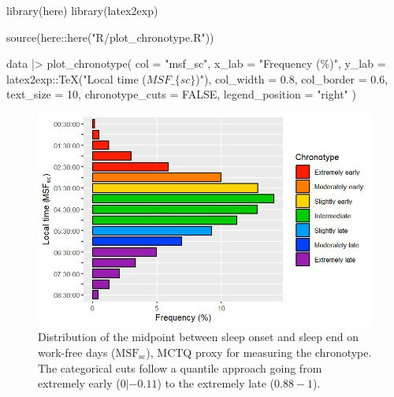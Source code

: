 \documentclass[
  12pt,
  a4paper,
  oneside]{tesesusp}
\newenvironment{Shaded}{\begin{snugshade}}{\end{snugshade}}
\newcommand{\AttributeTok}[1]{\textcolor[rgb]{0.40,0.45,0.13}{#1}}
\newcommand{\ConstantTok}[1]{\textcolor[rgb]{0.56,0.35,0.01}{#1}}
\newcommand{\DecValTok}[1]{\textcolor[rgb]{0.68,0.00,0.00}{#1}}
\newcommand{\FloatTok}[1]{\textcolor[rgb]{0.68,0.00,0.00}{#1}}
\newcommand{\FunctionTok}[1]{\textcolor[rgb]{0.28,0.35,0.67}{#1}}
\newcommand{\NormalTok}[1]{\textcolor[rgb]{0.00,0.23,0.31}{#1}}
\newcommand{\SpecialCharTok}[1]{\textcolor[rgb]{0.37,0.37,0.37}{#1}}
\newcommand{\StringTok}[1]{\textcolor[rgb]{0.13,0.47,0.30}{#1}}
\begin{document}
\begin{Shaded}
\begin{Highlighting}[numbers=left,,]
\FunctionTok{library}\NormalTok{(here)}
\FunctionTok{library}\NormalTok{(latex2exp)}

\FunctionTok{source}\NormalTok{(here}\SpecialCharTok{::}\FunctionTok{here}\NormalTok{(}\StringTok{"R/plot\_chronotype.R"}\NormalTok{))}

\NormalTok{data }\SpecialCharTok{|\textgreater{}} 
    \FunctionTok{plot\_chronotype}\NormalTok{(}
    \AttributeTok{col =} \StringTok{"msf\_sc"}\NormalTok{, }
    \AttributeTok{x\_lab =} \StringTok{"Frequency (\%)"}\NormalTok{,}
    \AttributeTok{y\_lab =}\NormalTok{ latex2exp}\SpecialCharTok{::}\FunctionTok{TeX}\NormalTok{(}\StringTok{"Local time ($MSF\_\{sc\}$)"}\NormalTok{),}
    \AttributeTok{col\_width =} \FloatTok{0.8}\NormalTok{,}
    \AttributeTok{col\_border =} \FloatTok{0.6}\NormalTok{,}
    \AttributeTok{text\_size =} \DecValTok{10}\NormalTok{,}
    \AttributeTok{chronotype\_cuts =} \ConstantTok{FALSE}\NormalTok{,}
    \AttributeTok{legend\_position =} \StringTok{"right"}
\NormalTok{  )}
\end{Highlighting}
\end{Shaded}

\begin{figure}[H]

\caption{\label{fig-ch-6-chronotype-distribution}Distribution of the
midpoint between sleep onset and sleep end on work-free days
(\(\text{MSF}_{\text{sc}}\)), MCTQ proxy for measuring the chronotype.
The categorical cuts follow a quantile approach going from extremely
early (\(0 |- 0.11\)) to the extremely late (\(0.88 - 1\)).}

{\centering \includegraphics{qmd/chapter-6_files/figure-pdf/fig-ch-6-chronotype-distribution-1.png}

}

\end{figure}
\end{document}
